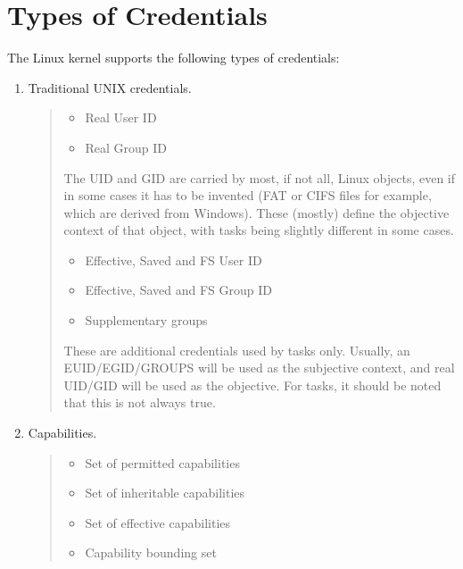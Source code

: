 \documentclass[a4paper,8pt,english]{sphinxmanual}
\begin{document}
\section{Types of Credentials}
\label{security/credentials:types-of-credentials}
The Linux kernel supports the following types of credentials:
\begin{enumerate}
\item {} 
Traditional UNIX credentials.
\begin{quote}
\begin{itemize}
\item {} 
Real User ID

\item {} 
Real Group ID

\end{itemize}

The UID and GID are carried by most, if not all, Linux objects, even if in
some cases it has to be invented (FAT or CIFS files for example, which are
derived from Windows).  These (mostly) define the objective context of
that object, with tasks being slightly different in some cases.
\begin{itemize}
\item {} 
Effective, Saved and FS User ID

\item {} 
Effective, Saved and FS Group ID

\item {} 
Supplementary groups

\end{itemize}

These are additional credentials used by tasks only.  Usually, an
EUID/EGID/GROUPS will be used as the subjective context, and real UID/GID
will be used as the objective.  For tasks, it should be noted that this is
not always true.
\end{quote}

\item {} 
Capabilities.
\begin{quote}
\begin{itemize}
\item {} 
Set of permitted capabilities

\item {} 
Set of inheritable capabilities

\item {} 
Set of effective capabilities

\item {} 
Capability bounding set


\end{itemize}
\end{quote}
\end{enumerate}
\end{document}
